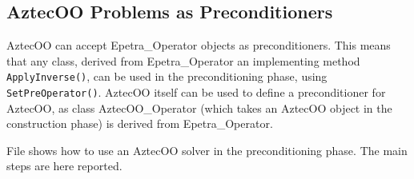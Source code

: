 
\subsection{AztecOO Problems as Preconditioners}
\label{sec:prec_aztecoo}

AztecOO can accept Epetra\_Operator objects as preconditioners. This
means that any class, derived from Epetra\_Operator an implementing
method \verb!ApplyInverse()!, can be used in the preconditioning phase,
using \verb!SetPreOperator()!. AztecOO itself can be used to define a
preconditioner for AztecOO, as class AztecOO\_Operator (which takes an
AztecOO object in the construction phase) is derived from
Epetra\_Operator.

File  shows how to use an AztecOO solver in the
preconditioning phase.  The main steps are here reported.

